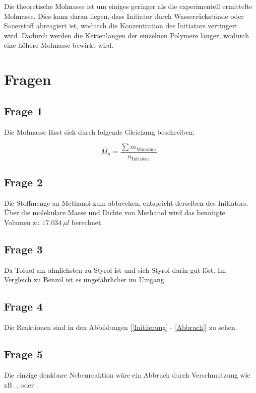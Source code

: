 \documentclass[10pt,a4paper,ngerman]{scrartcl}
\begin{document}
	Die theoretische Molmasse ist um einiges geringer als die experimentell ermittelte Molmasse. 
	Dies kann daran liegen, dass Initiator durch Wasserrückstände oder Sauerstoff abreagiert ist, wodurch die Konzentration des Initiators verringert wird. 
	Dadurch werden die Kettenlängen der einzelnen Polymere länger, wodurch eine höhere Molmasse bewirkt wird. 


\section{Fragen}

	\subsection{Frage 1}

		Die Molmasse lässt sich durch folgende Gleichung beschreiben:

		\begin{equation}
			\bar{M_n} = \frac{\sum m_\text{Monomer}}{n_\text{Initiator}}
		\end{equation}

	\subsection{Frage 2}

		Die Stoffmenge an Methanol zum abbrechen, entspricht derselben des Initiators. Über die molekulare Masse und Dichte von Methanol wird 
		das benötigte Volumen zu $\SI{17,034}{\mu l}$ berechnet. 

	\subsection{Frage 3}

		Da Toluol am ahnlichsten zu Styrol ist und sich Styrol darin gut löst. 
		Im Vergleich zu Benzol ist es ungefährlicher im Umgang. 

	\subsection{Frage 4}

		Die Reaktionen sind in den Abbildungen [\ref{Initiierung} - \ref{Abbruch}] zu sehen.

	\subsection{Frage 5}

		Die einzige denkbare Nebenreaktion wäre ein Abbruch durch Verschmutzung wie zB. ,  oder .
\end{document}
